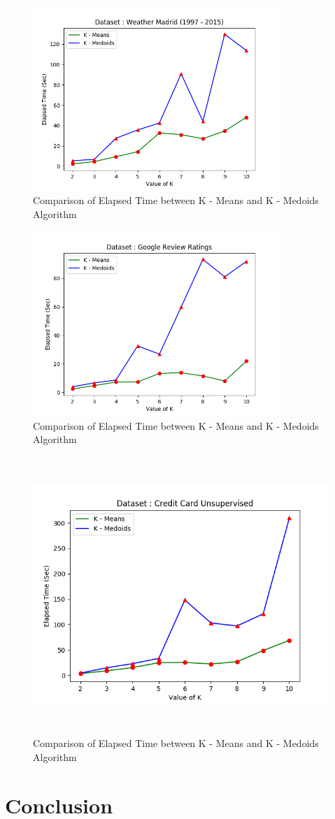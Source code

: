 \documentclass[12pt]{article}
\begin{document}
\begin{figure}[H]
	\centering
	\includegraphics[width = 0.75\linewidth, height = 7cm]{Weather.png}
	\caption{Comparison of Elapsed Time between K - Means and K - Medoids Algorithm}
	\label{fig:weather}
\end{figure}

\begin{figure}[H]
	\centering
	\includegraphics[width = 0.75\linewidth, height = 7cm]{Google.png}
	\caption{Comparison of Elapsed Time between K - Means and K - Medoids Algorithm}
	\label{fig:google}
\end{figure}

\begin{figure}[H]
	\centering
	\includegraphics[width = \linewidth, height = 10.5cm]{CreditCard.png}
	\caption{Comparison of Elapsed Time between K - Means and K - Medoids Algorithm}
	\label{fig:credit}
\end{figure}



\section{Conclusion}
\end{document}
